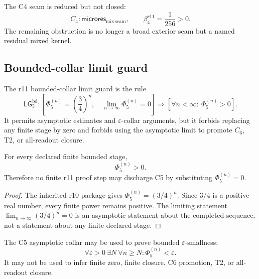 \begin{corollary}[r11 C4 status]
\label{cor:v470-r11-c4-status}
The C4 seam is reduced but not closed:
\[
C_4:\mathsf{microres}_{\mathrm{mix\ seam}},
\qquad
\beta_4^{r11}=\frac1{256}>0.
\]
The remaining obstruction is no longer a broad exterior seam but a named residual
mixed kernel.
\end{corollary}

\subsection{Bounded-collar limit guard}
\label{subsec:v470-r11-bounded-collar-limit-guard}

\begin{definition}
\label{def:v470-r11-bounded-collar-limit-guard}
The r11 bounded-collar limit guard is the rule
\[
\mathsf{LG}_5^{\mathrm{bd}}:
\left[
\Phi_5^{(n)}=\left(\frac34\right)^n,
\quad
\lim_{n\to\infty}\Phi_5^{(n)}=0
\right]
\Longrightarrow
\left[
\forall n<\infty:\ \Phi_5^{(n)}>0\right].
\]
It permits asymptotic estimates and \(\varepsilon\)-collar arguments, but it
forbids replacing any finite stage by zero and forbids using the asymptotic
limit to promote \(C_6\), T2, or all-readout closure.
\end{definition}

\begin{lemma}
\label{lem:v470-r11-finite-positive-guard}
For every declared finite bounded stage,
\[
\Phi_5^{(n)}>0.
\]
Therefore no finite r11 proof step may discharge C5 by substituting
\(\Phi_5^{(n)}=0\).
\end{lemma}

\begin{proof}
The inherited r10 package gives \(\Phi_5^{(n)}=(3/4)^n\).  Since \(3/4\) is a
positive real number, every finite power remains positive.  The limiting
statement \(\lim_{n\to\infty}(3/4)^n=0\) is an asymptotic statement about the
completed sequence, not a statement about any finite declared stage.
\end{proof}

\begin{proposition}
\label{prop:v470-r11-asymptotic-use-guard}
The C5 asymptotic collar may be used to prove bounded \(\varepsilon\)-smallness:
\[
\forall\varepsilon>0\ \exists N\ \forall n\ge N:
\Phi_5^{(n)}<\varepsilon.
\]
It may not be used to infer finite zero, finite closure, C6 promotion, T2, or
all-readout closure.
\end{proposition}

